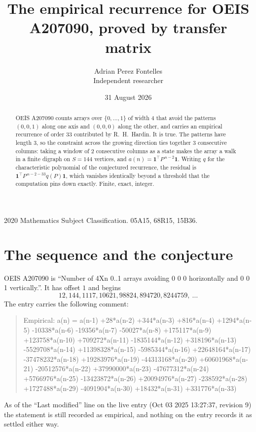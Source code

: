 \documentclass[11pt,a4paper]{article}
\title{The empirical recurrence for OEIS A207090, proved by transfer matrix}
\author{Adrian Perez Fontelles\\ \small Independent researcher}
\date{31 August 2026}
\theoremstyle{plain}
\theoremstyle{definition}
\begin{document}
\maketitle

\begin{abstract}
OEIS A207090 counts arrays over $\{0,\dots,1\}$ of width $4$ that avoid the patterns
$(0,0,1)$ along one axis and $(0,0,0)$ along the other, and carries an empirical recurrence of
order $33$ contributed by R.~H.~Hardin. It is true. The patterns have length $3$, so
the constraint across the growing direction ties together $3$ consecutive columns: taking a
window of $2$ consecutive columns as a state makes the array a walk in a finite digraph
on $S=144$ vertices, and $a(n)=\mathbf{1}^{\!\top}P^{\,n-2}\mathbf{1}$. Writing $q$
for the characteristic polynomial of the conjectured recurrence, the residual is
$\mathbf{1}^{\!\top}P^{\,n-2-33}q(P)\mathbf{1}$, which vanishes identically
beyond a threshold that the computation pins down exactly. Finite, exact, integer.
\end{abstract}

\noindent\small 2020 Mathematics Subject Classification. 05A15, 68R15, 15B36.\normalsize

\section{The sequence and the conjecture}

OEIS A207090 is ``Number of 4Xn 0..1 arrays avoiding 0 0 0 horizontally and 0 0 1 vertically.''. It has offset
$1$ and begins
\[
12, 144, 1117, 10621, 98824, 894720, 8244759,\ \dots
\]
The entry carries the following comment:
\begin{quote}\small
Empirical: a(n) = a(n-1) +28*a(n-2) +344*a(n-3) +816*a(n-4) +1294*a(n-5) -10338*a(n-6) -19356*a(n-7) -50027*a(n-8) +175117*a(n-9) +123758*a(n-10) +709272*a(n-11) -1835144*a(n-12) +318196*a(n-13) -5529708*a(n-14) +11398328*a(n-15) -5985344*a(n-16) +22648164*a(n-17) -37478232*a(n-18) +19283976*a(n-19) -44313168*a(n-20) +60601968*a(n-21) -20512576*a(n-22) +37990000*a(n-23) -47677312*a(n-24) +5766976*a(n-25) -13423872*a(n-26) +20094976*a(n-27) -238592*a(n-28) +1727488*a(n-29) -4091904*a(n-30) +18432*a(n-31) +331776*a(n-33)
\end{quote}
As of the ``Last modified'' line on the live entry (Oct 03 2025 13:27:37, revision
9) the statement is still recorded as empirical, and nothing on the entry
records it as settled either way.
\end{document}
